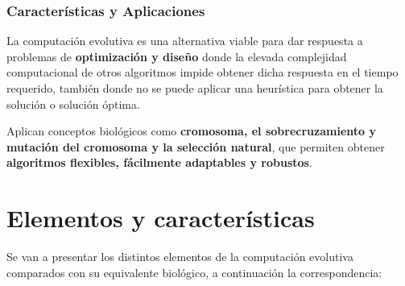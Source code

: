 \documentclass[12pt, twoside, openright]{report} %
\begin{document}
\subsubsection{Características  y Aplicaciones}
La computación evolutiva es una alternativa viable para dar respuesta a problemas de \textbf{optimización y diseño} donde la elevada complejidad computacional de otros algoritmos impide obtener dicha respuesta en el tiempo requerido, también donde no se puede aplicar una heurística para obtener la solución o solución óptima.

Aplican conceptos biológicos como \textbf{cromosoma, el sobrecruzamiento y mutación del cromosoma y la selección natural}, que permiten obtener \textbf{algoritmos flexibles, fácilmente adaptables y robustos}.

\section{Elementos y características}
Se van a presentar los distintos elementos de la computación evolutiva comparados con su equivalente biológico, a continuación la correspondencia:
\end{document}
